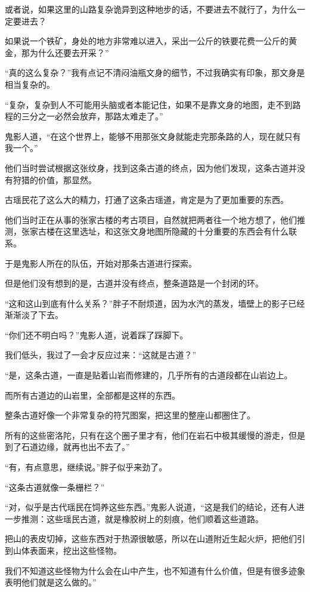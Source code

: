 或者说，如果这里的山路复杂诡异到这种地步的话，不要进去不就行了，为什么一定要进去？

如果说一个铁矿，身处的地方非常难以进入，采出一公斤的铁要花费一公斤的黄金，那为什么还要去开采？”

“真的这么复杂？”我有点记不清闷油瓶文身的细节，不过我确实有印象，那文身是相当复杂的。

“复杂，复杂到人不可能用头脑或者本能记住，如果不是靠文身的地图，走不到路程的三分之一必然会放弃，那路太难走了。”

鬼影人道，“在这个世界上，能够不用那张文身就能走完那条路的人，现在就只有我一个。”

他们当时尝试根据这张纹身，找到这条古道的终点，因为他们发现，这条古道并没有狩猎的价值，那显然。

古瑶民花了这么大的精力，打通了这条古瑶道，肯定是为了更加重要的东西。

他们当时正在从事的张家古楼的考古项目，自然就把两者往一个地方想了，他们推测，张家古楼在这里选址，和这张文身地图所隐藏的十分重要的东西会有什么联系。

于是鬼影人所在的队伍，开始对那条古道进行探索。

但是他们没有想到的是，古道并没有终点，整条道路是一个封闭的环。

“这和这山到底有什么关系？”胖子不耐烦道，因为水汽的蒸发，墙壁上的影子已经渐渐淡了下去。

“你们还不明白吗？”鬼影人道，说着踩了踩脚下。

我们低头，我过了一会才反应过来：“这就是古道？”

“是，这条古道，一直是贴着山岩而修建的，几乎所有的古道段都在山岩边上。

而所有古道边的山岩里，全部都是这样的东西。

整条古道好像一个非常复杂的符咒图案，把这里的整座山都圈住了。

所有的这些密洛陀，只有在这个圈子里才有，他们在岩石中极其缓慢的游走，但是到了石道边缘，就再也出不去了。”

“有，有点意思，继续说。”胖子似乎来劲了。

“这条古道就像一条栅栏？”

“对，似乎是古代瑶民在饲养这些东西。”鬼影人说道，“这是我们的结论，还有人进一步推测：这些瑶民古道，就是橡胶树上的刻痕，他们顺着这些道路。

把山的表皮切掉，这些东西对于热源很敏感，所以在山道附近生起火炉，把他们引到山体表面来，挖出这些怪物。

我们不知道这些怪物为什么会在山中产生，也不知道有什么价值，但是有很多迹象表明他们就是这么做的。”

